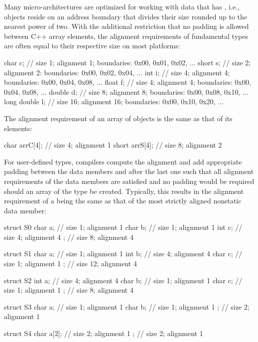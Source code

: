 Many micro-architectures are optimized for working with data that has , i.e., objects reside on an address boundary that divides their size rounded up to the nearest power of two.  With the additional restriction that no padding is allowed between C++ array elements, the alignment requirements of fundamental types are often equal to their respective size on most platforms:

\begin{emcppslisting}
char        c;  // size 1;  alignment 1;  boundaries: 0x00, 0x01, 0x02, ...
short       s;  // size 2;  alignment 2:  boundaries: 0x00, 0x02, 0x04, ...
int         i;  // size 4;  alignment 4;  boundaries: 0x00, 0x04, 0x08, ...
float       f;  // size 4;  alignment 4;  boundaries: 0x00, 0x04, 0x08, ...
double      d;  // size 8;  alignment 8;  boundaries: 0x00, 0x08, 0x10, ...
long double l;  // size 16; alignment 16; boundaries: 0x00, 0x10, 0x20, ...
\end{emcppslisting}

\noindent The alignment requirement of an array of objects is the same as that of its elements:

\begin{emcppslisting}
char  arrC[4];  // size 4; alignment 1
short arrS[4];  // size 8; alignment 2
\end{emcppslisting}

For user-defined types, compilers compute the alignment and add appropriate padding between the data members and after the last one such that all alignment requirements of the data members are satisfied and no padding would be required should an array of the type be created. Typically, this results in the alignment requirement of a  being the same as that of the most strictly aligned nonstatic data member:


\begin{emcppslisting}[emcppsbatch=e3]
struct S0
{
    char a;     // size 1; alignment 1
    char b;     // size 1; alignment 1
    int  c;     // size 4; alignment 4
};              // size 8; alignment 4

struct S1
{
    char a;     // size  1; alignment 1
    int  b;     // size  4; alignment 4
    char c;     // size  1; alignment 1
};              // size 12; alignment 4

struct S2
{
    int  a;     // size 4; alignment 4
    char b;     // size 1; alignment 1
    char c;     // size 1; alignment 1
};              // size 8; alignment 4

struct S3
{
    char a;     // size 1; alignment 1
    char b;     // size 1; alignment 1
};              // size 2; alignment 1

struct S4
{
    char a[2];  // size 2; alignment 1
};              // size 2; alignment 1
\end{emcppslisting}

